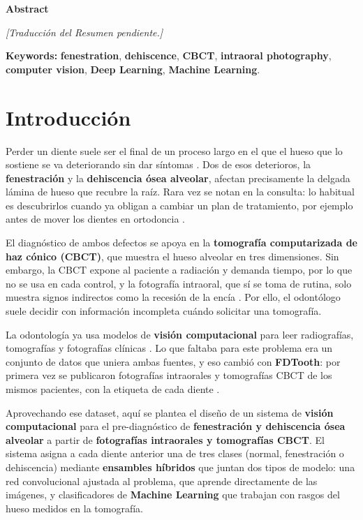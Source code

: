 \documentclass[12pt,a4paper]{article}
\newcommand{\prob}[1]{\textcolor{problema}{\textbf{#1}}}
\newcommand{\sol}[1]{\textcolor{solucion}{\textbf{#1}}}
\newcommand{\dat}[1]{\textcolor{dataset}{\textbf{#1}}}
\newcommand{\prob}[1]{#1}
\newcommand{\sol}[1]{#1}
\newcommand{\dat}[1]{#1}
\newcommand{\seccionsinnumero}[1]{%
  \section*{#1}\addcontentsline{toc}{section}{#1}}
\begin{document}
\begin{center}\textbf{Abstract}\end{center}
\textit{[Traducción del Resumen pendiente.]}

\noindent\textbf{Keywords:} \prob{fenestration}, \prob{dehiscence},
\dat{CBCT}, \dat{intraoral photography}, \sol{computer vision},
\sol{Deep Learning}, \sol{Machine Learning}.
\clearpage


\seccionsinnumero{Introducción}
Perder un diente suele ser el final de un proceso largo en el que el
hueso que lo sostiene se va deteriorando sin dar síntomas
\parencite{oms2025saludbucodental}. Dos de esos deterioros, la
\prob{fenestración} y la \prob{dehiscencia ósea alveolar}, afectan
precisamente la delgada lámina de hueso que recubre la raíz. Rara vez se
notan en la consulta: lo habitual es descubrirlos cuando ya obligan a
cambiar un plan de tratamiento, por ejemplo antes de mover los dientes en
ortodoncia \parencite{guo2026consenso}.

El diagnóstico de ambos defectos se apoya en la \dat{tomografía
computarizada de haz cónico (CBCT)}, que muestra el hueso alveolar en tres
dimensiones. Sin embargo, la CBCT expone al paciente a radiación y demanda
tiempo, por lo que no se usa en cada control, y la fotografía intraoral,
que sí se toma de rutina, solo muestra signos indirectos como la recesión
de la encía \parencite{liu2025fdtooth}. Por ello, el odontólogo suele
decidir con información incompleta cuándo solicitar una tomografía.

La odontología ya usa modelos de \sol{visión computacional} para leer
radiografías, tomografías y fotografías clínicas
\parencite{yuan2026integrating}. Lo que faltaba para este problema era un
conjunto de datos que uniera ambas fuentes, y eso cambió con
\dat{FDTooth}: por primera vez se publicaron fotografías intraorales y
tomografías CBCT de los mismos pacientes, con la etiqueta de cada diente
\parencite{liu2025fdtooth}.

Aprovechando ese dataset, aquí se plantea el diseño de un sistema de
\sol{visión computacional} para el pre-diagnóstico de \prob{fenestración y
dehiscencia ósea alveolar} a partir de \dat{fotografías intraorales y
tomografías CBCT}. El sistema asigna a cada diente anterior una de tres
clases (normal, fenestración o dehiscencia) mediante \sol{ensambles
híbridos} que juntan dos tipos de modelo: una red convolucional ajustada
al problema, que aprende directamente de las imágenes, y clasificadores
de \sol{Machine Learning} que trabajan con rasgos del hueso medidos en la
tomografía.
\end{document}
